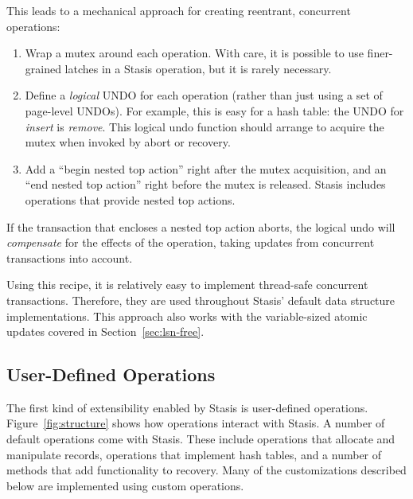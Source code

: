 \documentclass[letterpaper,twocolumn,10pt]{article}
\newcommand{\yad}{Stasis\xspace}
\newcommand{\yads}{Stasis'\xspace}
\begin{document}
This leads to a mechanical approach for creating reentrant, concurrent
operations:

\begin{enumerate}
\item Wrap a mutex around each operation.  With care, it is possible 
  to use finer-grained latches in a \yad operation, but it is rarely necessary.
\item Define a {\em logical} UNDO for each operation (rather than just
  using a set of page-level UNDOs).  For example, this is easy for a
  hash table: the UNDO for {\em insert} is {\em remove}.  This logical
  undo function should arrange to acquire the mutex when invoked by
  abort or recovery.
\item Add a ``begin nested top action'' right after the mutex
  acquisition, and an ``end nested top action'' right before the mutex
  is released.  \yad includes operations that provide nested top
  actions.
\end{enumerate}

If the transaction that encloses a nested top action aborts, the
logical undo will {\em compensate} for the effects of the operation, 
taking updates from concurrent transactions into account.

Using this recipe, it is relatively easy to implement thread-safe
concurrent transactions.  Therefore, they are used throughout \yads
default data structure implementations.  This approach also works 
with the variable-sized atomic updates covered in Section~\ref{sec:lsn-free}.





\subsection{User-Defined Operations}

The first kind of extensibility enabled by \yad is user-defined operations.
Figure~\ref{fig:structure} shows how operations interact with \yad.  A
number of default operations come with \yad.  These include operations
that allocate and manipulate records, operations that implement hash
tables, and a number of methods that add functionality to recovery.
Many of the customizations described below are implemented using
custom operations. 
\end{document}
